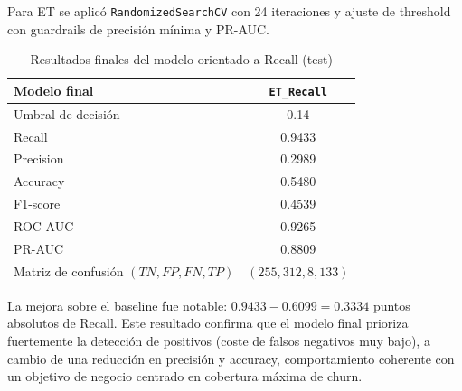 Para ET se aplicó \texttt{RandomizedSearchCV} con 24 iteraciones y ajuste de threshold con guardrails de precisión mínima y PR-AUC.

\begin{table}[h]
\centering
\caption{Resultados finales del modelo orientado a Recall (test)}
\begin{tabular}{|l|c|}
\hline
Modelo final & \texttt{ET\_Recall} \\
\hline
Umbral de decisión & 0.14 \\
\hline
Recall & 0.9433 \\
\hline
Precision & 0.2989 \\
\hline
Accuracy & 0.5480 \\
\hline
F1-score & 0.4539 \\
\hline
ROC-AUC & 0.9265 \\
\hline
PR-AUC & 0.8809 \\
\hline
Matriz de confusión $(TN,FP,FN,TP)$ & $(255,312,8,133)$ \\
\hline
\end{tabular}
\end{table}

La mejora sobre el baseline fue notable: $0.9433 - 0.6099 = 0.3334$ puntos absolutos de Recall. Este resultado confirma que el modelo final prioriza fuertemente la detección de positivos (coste de falsos negativos muy bajo), a cambio de una reducción en precisión y accuracy, comportamiento coherente con un objetivo de negocio centrado en cobertura máxima de churn.
